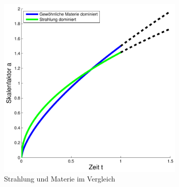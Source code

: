 \begin{refsection}
\begin{figure}[h]
	\centering
	\includegraphics[width  = 0.8\textwidth]{friedmann/images/strahlungMaterie.pdf}
	\caption{Strahlung und Materie im Vergleich
		\label{friedmann:strahlungMaterie}}
\end{figure}


\end{refsection}
